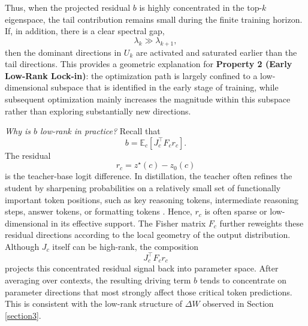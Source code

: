 \documentclass{article}
\begin{document}
Thus, when the projected residual \(b\) is highly concentrated in the top-\(k\) eigenspace, the tail contribution remains small during the finite training horizon. If, in addition, there is a clear spectral gap,
\begin{equation}
\lambda_k \gg \lambda_{k+1},
\end{equation}
then the dominant directions in \(U_k\) are activated and saturated earlier than the tail directions. This provides a geometric explanation for \textbf{Property 2 (Early Low-Rank Lock-in)}: the optimization path is largely confined to a low-dimensional subspace that is identified in the early stage of training, while subsequent optimization mainly increases the magnitude within this subspace rather than exploring substantially new directions.

\emph{Why is \(b\) low-rank in practice?}
Recall that
\begin{equation}
b=\mathbb{E}_c[J_c^{\top}F_cr_c].
\end{equation}
The residual
\[
r_c=z^{\star}(c)-z_0(c)
\]
is the teacher-base logit difference. In distillation, the teacher often refines the student by sharpening probabilities on a relatively small set of functionally important token positions, such as key reasoning tokens, intermediate reasoning steps, answer tokens, or formatting tokens \citep{xu2026tip}. Hence, \(r_c\) is often sparse or low-dimensional in its effective support. The Fisher matrix \(F_c\) further reweights these residual directions according to the local geometry of the output distribution. Although \(J_c\) itself can be high-rank, the composition
\[
J_c^{\top}F_cr_c
\]
projects this concentrated residual signal back into parameter space. After averaging over contexts, the resulting driving term \(b\) tends to concentrate on parameter directions that most strongly affect those critical token predictions. This is consistent with the low-rank structure of \(\Delta W\) observed in Section \ref{section3}.
\end{document}
